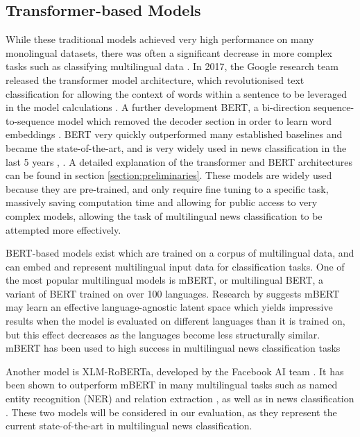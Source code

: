 \documentclass{l4proj}
\begin{document}
\subsection{Transformer-based Models}
\label{section:transformer-based-models}
While these traditional models achieved very high performance on many monolingual datasets, there was often a significant decrease in more complex tasks such as classifying multilingual data \citep{vogel2020detecting}. In 2017, the Google research team released the transformer model architecture, which revolutionised text classification for allowing the context of words within a sentence to be leveraged in the model calculations \citep{vaswani2017attention}. A further development BERT, a bi-direction sequence-to-sequence model which removed the decoder section in order to learn word embeddings \citep{devlin2018bert}. BERT very quickly outperformed many established baselines and became the state-of-the-art, and is very widely used in news classification in the last 5 years \citep{chen2022long, mujahid2021classification, deping2021news}, . A detailed explanation of the transformer and BERT architectures can be found in section \ref{section:preliminaries}. These models are widely used because they are pre-trained, and only require fine tuning to a specific task, massively saving computation time and allowing for public access to very complex models, allowing the task of multilingual news classification to be attempted more effectively.

BERT-based models exist which are trained on a corpus of multilingual data, and can embed and represent multilingual input data for classification tasks. One of the most popular multilingual models is mBERT, or multilingual BERT, a variant of BERT trained on over 100 languages. Research by \cite{pires2019multilingual} suggests mBERT may learn an effective language-agnostic latent space which yields impressive results when the model is evaluated on different languages than it is trained on, but this effect decreases as the languages become less structurally similar. mBERT has been used to high success in multilingual news classification tasks \citep{kakwani2020indicnlpsuite, hutama2022indonesian} \par
Another model is XLM-RoBERTa, developed by the Facebook AI team \citep{conneau2019unsupervised}. It has been shown to outperform mBERT in many multilingual tasks such as named entity recognition (NER) and relation extraction \citep{li2021cross, lan2020empirical}, as well as in news classification \citep{alam2020bangla}. These two models will be considered in our evaluation, as they represent the current state-of-the-art in multilingual news classification.
\end{document}
